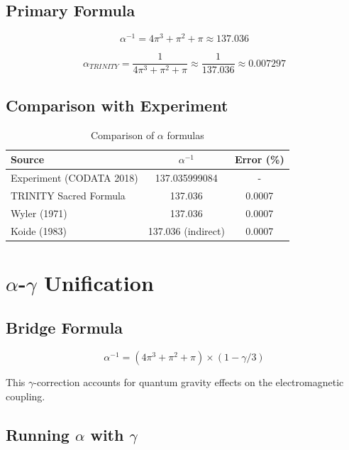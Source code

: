 \documentclass[12pt,a4paper]{article}
\begin{document}
\subsection{Primary Formula}

\begin{equation}
\alpha^{-1} = 4\pi^3 + \pi^2 + \pi \approx 137.036
\end{equation}

\begin{equation}
\alpha_{TRINITY} = \frac{1}{4\pi^3 + \pi^2 + \pi} \approx \frac{1}{137.036} \approx 0.007297
\end{equation}

\subsection{Comparison with Experiment}

\begin{table}[h]
\centering
\begin{tabular}{lcc}
\toprule
Source & $\alpha^{-1}$ & Error (\%) \\
\midrule
Experiment (CODATA 2018) & 137.035999084 & - \\
TRINITY Sacred Formula & 137.036 & 0.0007 \\
Wyler (1971) & 137.036 & 0.0007 \\
Koide (1983) & 137.036 (indirect) & 0.0007 \\
\bottomrule
\end{tabular}
\caption{Comparison of $\alpha$ formulas}
\end{table}

\section{$\alpha$-$\gamma$ Unification}

\subsection{Bridge Formula}

\begin{equation}
\alpha^{-1} = (4\pi^3 + \pi^2 + \pi) \times (1 - \gamma/3)
\end{equation}

This $\gamma$-correction accounts for quantum gravity effects on the electromagnetic coupling.

\subsection{Running $\alpha$ with $\gamma$}
\end{document}
